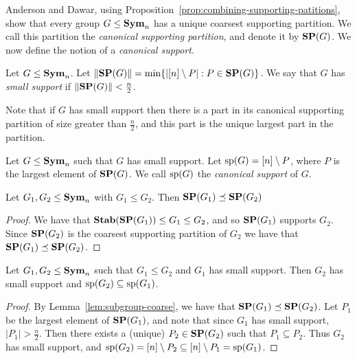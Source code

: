 \documentclass[../main/thesis.tex]{subfiles}
\begin{document}
Anderson and Dawar, using Proposition~\ref{prop:combining-supporting-patitions},
show that every group $G \leq \text{\textbf{Sym}}_n$ has a unique coarsest supporting
partition. We call this partition the \emph{canonical supporting partition}, and
denote it by $\text{\textbf{SP}} (G)$. We now define the notion of a \emph{canonical support}.

\begin{definition}
  Let $G \leq \text{\textbf{Sym}}_n$. Let $\| \text{\textbf{SP}}(G) \| = \min \{\vert [n] \setminus P \vert :
  P \in \text{\textbf{SP}}(G) \}$. We say that $G$ has \emph{small support} if $\| \text{\textbf{SP}}(G) \| <
  \frac{n}{2}$.
\end{definition}

Note that if $G$ has small support then there is a part in its canonical
supporting partition of size greater than $\frac{n}{2}$, and this part is the
unique largest part in the partition.

\begin{definition}
  Let $G \leq \text{\textbf{Sym}}_n$ such that $G$ has small support. Let $\text{sp}(G) = [n]
  \setminus P$, where $P$ is the largest element of $\text{\textbf{SP}}(G)$. We call
  $\text{sp}(G)$ the \emph{canonical support} of $G$.
\end{definition}

\begin{lem}\label{lem:subgroup-coarse}
  Let $G_1, G_2 \leq \text{\textbf{Sym}}_n$ with $G_1 \leq G_2$. Then $\text{\textbf{SP}}(G_1) \preceq
  \text{\textbf{SP}}(G_2)$
\end{lem}
\begin{proof}
  We have that $\text{\textbf{Stab}}(\text{\textbf{SP}}(G_1)) \leq G_1 \leq G_2$, and so $\text{\textbf{SP}}(G_1)$ supports
  $G_2$. Since $\text{\textbf{SP}}(G_2)$ is the coarsest supporting partition of $G_2$ we have
  that $\text{\textbf{SP}}(G_1) \preceq \text{\textbf{SP}}(G_2)$.
\end{proof}

\begin{lem}
  Let $G_1, G_2 \leq \text{\textbf{Sym}}_n$ such that $G_1 \leq G_2$ and $G_1$ has small
  support. Then $G_2$ has small support and $\text{sp}(G_2) \subseteq \text{sp}(G_1)$.
  \label{lem:support-containment}
\end{lem}
\begin{proof}
  By Lemma~\ref{lem:subgroup-coarse}, we have that $\text{\textbf{SP}}(G_1) \preceq \text{\textbf{SP}}(G_2)$.
  Let $P_1$ be the largest element of $\text{\textbf{SP}}(G_1)$, and note that since $G_1$ has
  small support, $\vert P_1 \vert > \frac{n}{2}$. Then there exists a (unique)
  $P_2 \in \text{\textbf{SP}}(G_2)$ such that $P_1 \subseteq P_2$. Thus $G_2$ has small
  support, and $\text{sp}(G_2) = [n] \setminus P_2 \subseteq [n] \setminus P_1 =
  \text{sp}(G_1)$.
\end{proof}
\end{document}
